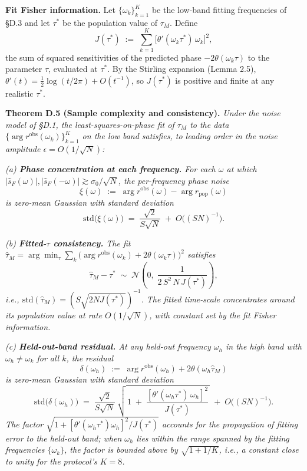 \documentclass[
  letterpaper,
  11pt]{article}
\theoremstyle{plain}
\theoremstyle{definition}
\theoremstyle{remark}
\begin{document}
\textbf{Fit Fisher information.} Let \(\{\omega_k\}_{k=1}^K\) be the low-band fitting frequencies of §D.3 and let \(\tau^*\) be the population value of \(\tau_M\). Define
\[J(\tau^*) \;:=\; \sum_{k=1}^K \bigl[\theta'(\omega_k\tau^*)\,\omega_k\bigr]^2,\]
the sum of squared sensitivities of the predicted phase \(-2\theta(\omega_k\tau)\) to the parameter \(\tau\), evaluated at \(\tau^*\). By the Stirling expansion (Lemma 2.5), \(\theta'(t) = \tfrac{1}{2}\log(t/2\pi) + O(t^{-1})\), so \(J(\tau^*)\) is positive and finite at any realistic \(\tau^*\).

\textbf{Theorem D.5 (Sample complexity and consistency).} \emph{Under the noise model of §D.1, the least-squares-on-phase fit of \(\tau_M\) to the data \(\{\arg r^{\text{obs}}(\omega_k)\}_{k=1}^K\) on the low band satisfies, to leading order in the noise amplitude \(\epsilon = O(1/\sqrt{N})\):}

\emph{(a) \textbf{Phase concentration at each frequency.} For each \(\omega\) at which \(|\hat s_F(\omega)|, |\hat s_F(-\omega)| \gtrsim \sigma_0/\sqrt N\), the per-frequency phase noise}
\[\xi(\omega) \;:=\; \arg r^{\text{obs}}(\omega) - \arg r_{\text{pop}}(\omega)\]
\emph{is zero-mean Gaussian with standard deviation}
\[\mathrm{std}\bigl(\xi(\omega)\bigr) \;=\; \frac{\sqrt{2}}{S\sqrt{N}} \;+\; O\!\bigl((SN)^{-1}\bigr).\]

\emph{(b) \textbf{Fitted-\(\tau\) consistency.} The fit \(\hat\tau_M = \arg\min_\tau \sum_k \bigl(\arg r^{\text{obs}}(\omega_k) + 2\theta(\omega_k\tau)\bigr)^2\) satisfies}
\[\hat\tau_M - \tau^* \;\sim\; \mathcal{N}\!\left(0,\; \frac{1}{2\,S^2\,N\,J(\tau^*)}\right),\]
\emph{i.e., \(\mathrm{std}(\hat\tau_M) = (S\sqrt{2 N J(\tau^*)})^{-1}\). The fitted time-scale concentrates around its population value at rate \(O(1/\sqrt{N})\), with constant set by the fit Fisher information.}

\emph{(c) \textbf{Held-out-band residual.} At any held-out frequency \(\omega_h\) in the high band with \(\omega_h \neq \omega_k\) for all \(k\), the residual}
\[\delta(\omega_h) \;:=\; \arg r^{\text{obs}}(\omega_h) + 2\theta(\omega_h\hat\tau_M)\]
\emph{is zero-mean Gaussian with standard deviation}
\[\mathrm{std}\bigl(\delta(\omega_h)\bigr) \;=\; \frac{\sqrt{2}}{S\sqrt{N}}\,\sqrt{\,1 \;+\; \frac{[\theta'(\omega_h\tau^*)\,\omega_h]^2}{J(\tau^*)}\,} \;+\; O\!\bigl((SN)^{-1}\bigr).\]
\emph{The factor \(\sqrt{1 + [\theta'(\omega_h\tau^*)\omega_h]^2/J(\tau^*)}\) accounts for the propagation of fitting error to the held-out band; when \(\omega_h\) lies within the range spanned by the fitting frequencies \(\{\omega_k\}\), the factor is bounded above by \(\sqrt{1 + 1/K}\), i.e., a constant close to unity for the protocol's \(K = 8\).}
\end{document}
